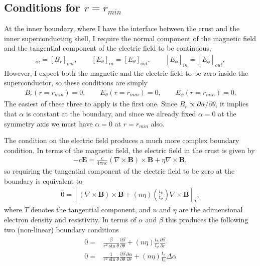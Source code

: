 \documentclass[letterpaper,10pt]{article}
\newcommand{\pp}{\partial}
\renewcommand{\vec}[1]{\boldsymbol#1}
\begin{document}
\subsection{Conditions for $r=r_{min}$}
At the inner boundary, where I have the interface between the crust and the inner superconducting shell, I require the normal component of the magnetic field and the tangential component of the electric field to be continuous,
\begin{eqnarray}
[B_r]_{in}=[B_r]_{out},\qquad [E_{\theta}]_{in}=[E_{\theta}]_{out},\qquad [E_{\phi}]_{in}=[E_{\phi}]_{out},
\end{eqnarray}
However, I expect both the magnetic and the electric field to be zero inside the superconductor, so these conditions are simply
\begin{eqnarray}
B_r(r=r_{min})=0,\qquad E_{\theta}(r=r_{min})=0,\qquad E_{\phi}(r=r_{min})=0.
\end{eqnarray}
The easiest of these three to apply is the first one. Since $B_r\propto \pp\alpha/\pp\theta$, it implies that $\alpha$ is constant at the boundary, and since we already fixed $\alpha=0$ at the symmetry axis we must have $\alpha=0$ at  $r=r_{min}$ also.

The condition on the electric field produces a much more complex boundary condition. In terms of the magnetic field, the electric field in the crust is given by
\begin{eqnarray}
-c\vec{E}=\frac{c}{4\pi n e}(\nabla\times\vec{B})\times\vec{B}+\eta\nabla\times\vec{B},
\end{eqnarray}
so requiring the tangential component of the electric field to be zero at the boundary is equivalent to
\begin{eqnarray}
0=\left[(\nabla\times\vec{B})\times\vec{B}+(n\eta)\left(\frac{t_h}{t_d}\right)\nabla\times\vec{B}\right]_T,
\end{eqnarray}
where $T$ denotes the tangential component, and $n$ and $\eta$ are the adimensional electron density and resistivity. In terms of $\alpha$ and $\beta$ this produces the following two (non-linear) boundary conditions
\begin{eqnarray}
\begin{aligned}
0=&\frac{\beta}{r^2\sin\theta}\frac{\pp\beta}{\pp\theta}+(n\eta)\frac{t_h}{t_d}\frac{\pp\beta}{\pp r}\\
0=&\frac{1}{r^2\sin\theta}\frac{\pp\beta}{\pp\theta}\frac{\pp\alpha}{\pp r}+(n\eta)\frac{t_h}{t_d}\Delta\alpha
\end{aligned}
\end{eqnarray}
\end{document}
